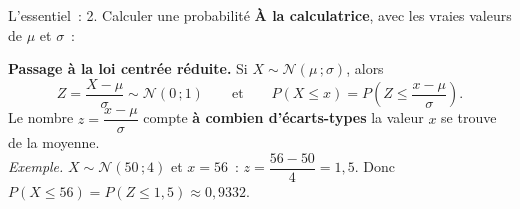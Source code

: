 \documentclass[a4paper,11pt]{article}
\begin{document}
\begin{rappel}{L'essentiel~: 2. Calculer une probabilité}
\textbf{À la calculatrice}, avec les vraies valeurs de $\mu$ et $\sigma$~:
\par{}\smallskip
\textbf{Passage à la loi centrée réduite.} Si $X \sim \mathcal{N}(\mu\,;\sigma)$, alors
\[
Z = \frac{X - \mu}{\sigma} \sim \mathcal{N}(0\,;1) \qquad\text{et}\qquad
P(X \leq x) = P\!\left(Z \leq \frac{x - \mu}{\sigma}\right).
\]
Le nombre $z = \dfrac{x-\mu}{\sigma}$ compte \textbf{à combien d'écarts-types} la valeur $x$ se trouve de la moyenne.\\[3pt]
\textit{Exemple.} $X \sim \mathcal{N}(50\,;4)$ et $x = 56$~: $z = \dfrac{56-50}{4} = 1{,}5$. Donc $P(X \leq 56) = P(Z \leq 1{,}5) \approx 0{,}9332$.
\end{rappel}
\end{document}
